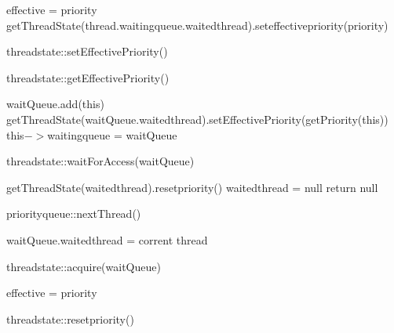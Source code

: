 \documentclass[a4paper,10pt]{article}
\begin{document}
\begin{algorithm}
\DontPrintSemicolon %
 {
    effective = priority\;
    {
       getThreadState(thread.waitingqueue.waitedthread).seteffectivepriority(priority)\;
    }
  }
\caption{threadstate::setEffectivePriority()}
\label{algo:max}
\end{algorithm}


\begin{algorithm}
\DontPrintSemicolon %
\;
\caption{threadstate::getEffectivePriority()}
\end{algorithm}

\begin{algorithm}
\DontPrintSemicolon %
waitQueue.add(this)\;
getThreadState(waitQueue.waitedthread).setEffectivePriority(getPriority(this))\;
this$->$waitingqueue = waitQueue\;
\caption{threadstate::waitForAccess(waitQueue)}
\end{algorithm}

\begin{algorithm}
\DontPrintSemicolon %
 {
    getThreadState(waitedthread).resetpriority()\;
    waitedthread = null\;
    return null\;  }
\caption{priorityqueue::nextThread()}
\end{algorithm}


\begin{algorithm}
\DontPrintSemicolon %
waitQueue.waitedthread = corrent thread\;
\caption{threadstate::acquire(waitQueue)}
\end{algorithm}

\begin{algorithm}
\DontPrintSemicolon %
effective = priority\;
\caption{threadstate::resetpriority()}
\end{algorithm}
\end{document}
